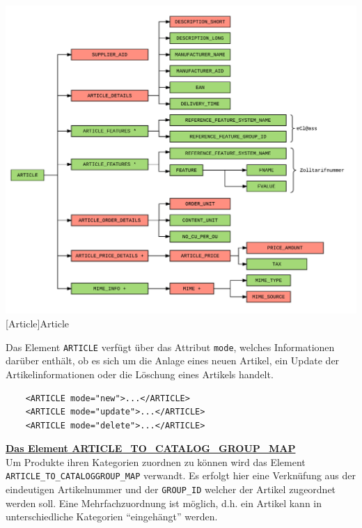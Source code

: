 	\begin{minipage}{\linewidth}
		\vspace{1em}
		\centering
		\includegraphics[width=1\linewidth]{img/Article}
		[Article]{Article}
		\label{fig:header}
		\vspace{1em}
	\end{minipage}
	
	Das Element \texttt{ARTICLE} verfügt über das Attribut \texttt{mode}, welches Informationen darüber enthält, ob es sich um die Anlage eines neuen Artikel, ein Update der Artikelinformationen oder die Löschung eines Artikels handelt.
	
	\begin{lstlisting}
	<ARTICLE mode="new">...</ARTICLE>
	<ARTICLE mode="update">...</ARTICLE>
	<ARTICLE mode="delete">...</ARTICLE>
	\end{lstlisting}
	\pagebreak
	
	
	\textbf{\underline{Das Element ARTICLE\_TO\_CATALOG\_GROUP\_MAP}}\\
	
	Um Produkte ihren Kategorien zuordnen zu können wird das Element \texttt{ARTICLE\_TO\_CATALOGGROUP\_MAP} verwandt. Es erfolgt hier eine Verknüfung aus der eindeutigen Artikelnummer und der \texttt{GROUP\_ID} welcher der Artikel zugeordnet werden soll. Eine Mehrfachzuordnung ist möglich, d.h. ein Artikel kann in unterschiedliche Kategorien \enquote{eingehängt} werden.
	
